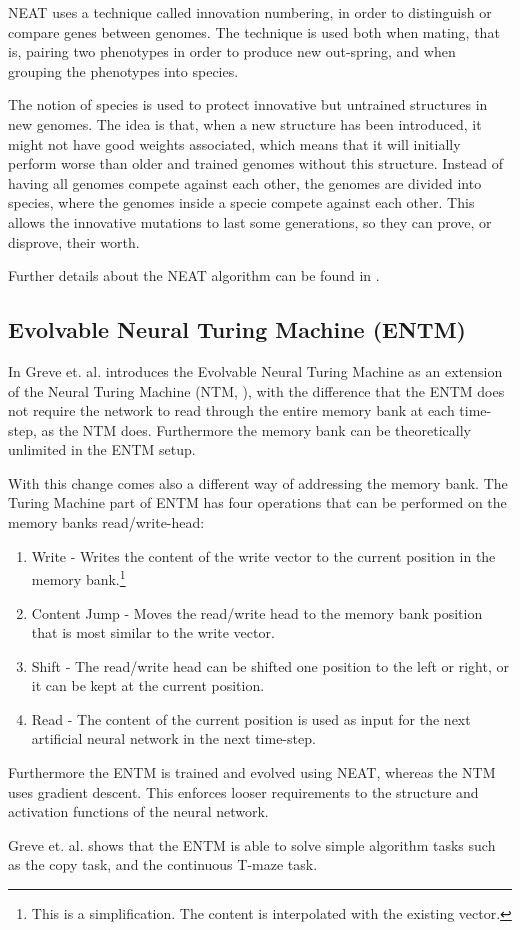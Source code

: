 \newpar NEAT uses a technique called innovation numbering, in order to distinguish or compare genes between genomes. The technique is used both when mating, that is, pairing two phenotypes in order to produce new out-spring, and when grouping the phenotypes into species.

\newpar The notion of species is used to protect innovative but untrained structures in new genomes. The idea is that, when a new structure has been introduced, it might not have good weights associated, which means that it will initially perform worse than older and trained genomes without this structure. Instead of having all genomes compete against each other, the genomes are divided into species, where the genomes inside a specie compete against each other. This allows the innovative mutations to last some generations, so they can prove, or disprove, their worth.

\newpar Further details about the NEAT algorithm can be found in \cite{stanley2002evolving}.

\subsection{Evolvable Neural Turing Machine (ENTM)}
In \cite{greve2016evolving} Greve et. al. introduces the Evolvable Neural Turing Machine as an extension of the Neural Turing Machine (NTM, \cite{graves2014neural}), with the difference that the ENTM does not require the network to read through the entire memory bank at each time-step, as the NTM does. Furthermore the memory bank can be theoretically unlimited in the ENTM setup.

\newpar With this change comes also a different way of addressing the memory bank. The Turing Machine part of ENTM has four operations that can be performed on the memory banks read/write-head:

\begin{enumerate}
	\item Write - Writes the content of the write vector to the current position in the memory bank.\footnote{This is a simplification. The content is interpolated with the existing vector.}
	\item Content Jump - Moves the read/write head to the memory bank position that is most similar to the write vector.
	\item Shift - The read/write head can be shifted one position to the left or right, or it can be kept at the current position.
	\item Read - The content of the current position is used as input for the next artificial neural network in the next time-step.
\end{enumerate}

\newpar Furthermore the ENTM is trained and evolved using NEAT, whereas the NTM uses gradient descent. This enforces looser requirements to the structure and activation functions of the neural network.

\newpar Greve et. al. shows that the ENTM is able to solve simple algorithm tasks such as the copy task, and the continuous T-maze task.
